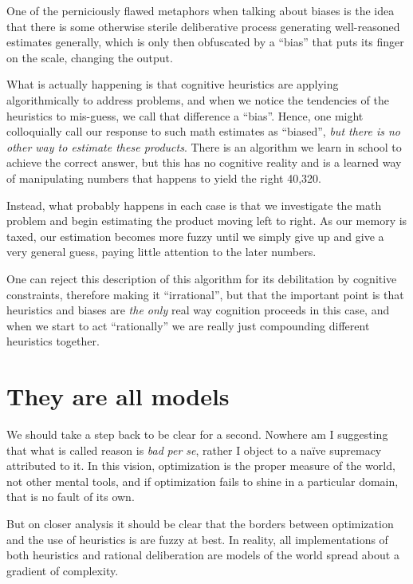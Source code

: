\documentclass{article}
\begin{document}
One of the perniciously flawed metaphors when talking about biases is the idea that there is some otherwise sterile deliberative process generating well-reasoned estimates generally, which is only then obfuscated by a ``bias'' that puts its finger on the scale, changing the output.

What is actually happening is that cognitive heuristics are applying algorithmically to address problems, and when we notice the tendencies of the heuristics to mis-guess, we call that difference a ``bias''.
Hence, one might colloquially call our response to such math estimates as ``biased'', \emph{but there is no other way to estimate these products}.
There is an algorithm we learn in school to achieve the correct answer, but this has no cognitive reality and is a learned way of manipulating numbers that happens to yield the right 40,320.

Instead, what probably happens in each case is that we investigate the math problem and begin estimating the product moving left to right.
As our memory is taxed, our estimation becomes more fuzzy until we simply give up and give a very general guess, paying little attention to the later numbers.

One can reject this description of this algorithm for its debilitation by cognitive constraints, therefore making it ``irrational'', but that the important point is that heuristics and biases are \emph{the only} real way cognition proceeds in this case, and when we start to act ``rationally'' we are really just compounding different heuristics together.

\section{They are all models\label{models}}

We should take a step back to be clear for a second.
Nowhere am I suggesting that what is called reason is \emph{bad} \textit{per se}, rather I object to a na{\"i}ve supremacy attributed to it.
In this vision, optimization is the proper measure of the world, not other mental tools, and if optimization fails to shine in a particular domain, that is no fault of its own.

But on closer analysis it should be clear that the borders between optimization and the use of heuristics is are fuzzy at best.
In reality, all implementations of both heuristics and rational deliberation are models of the world spread about a gradient of complexity.
\end{document}

